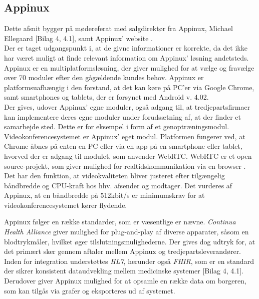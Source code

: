 \subsection{Appinux}
Dette afsnit bygger på mødereferat med salgdirektør fra Appinux, Michael Ellegaard [Bilag 4, 4.1], samt Appinux' website \cite{appinuxwebsite}.\\Der er taget udgangspunkt i, at de givne informationer er korrekte, da det ikke har været muligt at finde relevant information om Appinux' løsning andetsteds.\\
Appinux er en multiplatformsløsning, der giver mulighed for at vælge og fravælge over 70 moduler efter den gågældende kundes behov. Appinux er platformsuafhængig i den forstand, at det kan køre på PC'er via Google Chrome, samt  smartphones og tablets, der er forsynet med Android v. 4.02.\\Der gives, udover Appinux' egne moduler, også adgang til, at tredjepartsfirmaer kan implementere deres egne moduler under forudsætning af, at der finder et samarbejde sted. Dette er for eksempel i form af et genoptræningsmodul.\\Videokonferencesystemet er Appinux' eget modul. Platformen fungerer ved, at Chrome åbnes på enten en PC eller via en app på en smartphone eller tablet, hvorved der er adgang til modulet, som anvender WebRTC. WebRTC er et open source-projekt, som giver mulighed for realtidskommunikation via en browser \cite{webrtchjemmeside}. Det har den funktion, at videokvaliteten bliver justeret efter tilgængelig båndbredde og CPU-kraft hos hhv. afsender og modtager. Det vurderes af Appinux, at en båndbredde på 512kbit/s er minimumskrav for at videokonferencesystemet kører flydende.

Appinux følger en række standarder, som er væsentlige   er nævne. \textit{Continua Health Alliance} giver mulighed for plug-and-play af diverse apparater, såsom en blodtrykmåler, hvilket øger tilslutningsmulighederne. Der gives dog udtryk for, at det primært sker gennem aftaler mellem Appinux og tredjepartsleverandører. Inden for integration understøttes \textit{HL7}, herunder også \textit{FHIR}, som er en standard der sikrer konsistent dataudvekling mellem medicinske systemer [Bilag 4, 4.1]. Derudover giver Appinux mulighed for at opsamle en række data om borgeren, som kan tilgås via grafer og eksporteres ud af systemet.

